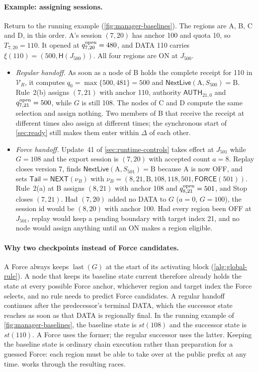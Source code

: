 \documentclass[11pt,a4paper]{article}
\newcommand{\Hash}{\mathsf H}
\newcommand{\tagg}[1]{\ensuremath{\mathsf{#1}}}
\begin{document}
\paragraph{Example: assigning sessions.}
Return to the running example (\cref{fig:manager-baselines}). The
regions are A, B, C and D, in this order. A's session $(7,20)$ has
anchor 100 and quota 10, so $T_{7,20}=110$. It opened at
$q^{\rm open}_{7,20}=480$, and DATA 110 carries
$\xi(110)=(500,\Hash(J_{500}))$. All four regions are ON at $J_{500}$.
\begin{itemize}
\item \emph{Regular handoff.} As soon as a node of B holds the complete
receipt for 110 in $\mathcal V_R$, it computes
$q_0=\max\{500,481\}=500$ and
$\tagg{NextLive}(\text{A},S_{500})=\text{B}$. Rule~2(b) assigns
$(7,21)$ with anchor 110, authority $\tagg{AUTH}_{21,0}$ and
$q^{\rm open}_{7,21}=500$, while $G$ is still 108. The nodes of C and D
compute the same selection and assign nothing. Two members of B that
receive the receipt at different times also assign at different times;
the synchronous start of \cref{sec:ready} still makes them enter within
$\Delta$ of each other.
\item \emph{Force handoff.} Update~41 of \cref{sec:runtime-controls}
takes effect at $J_{501}$ while $G=108$ and the export session is
$(7,20)$ with accepted count $a=8$. Replay closes version 7, finds
$\tagg{NextLive}(\text{A},S_{501})=\text{B}$ because A is now OFF, and
sets $\mathsf{Tail}=\tagg{NEXT}(\nu_B)$ with
$\nu_B=(8,21,\text{B},108,118,501,\tagg{FORCE}(501))$. Rule~2(a) at B assigns
$(8,21)$ with anchor 108 and $q^{\rm open}_{8,21}=501$, and Stop closes
$(7,21)$. Had $(7,20)$ added no DATA to $G$ ($a=0$, $G=100$), the
session id would be $(8,20)$ with anchor 100. Had every region been OFF
at $J_{501}$, replay would keep a pending boundary with target index 21,
and no node would assign anything until an ON makes a region eligible.
\end{itemize}

\paragraph{Why two checkpoints instead of Force candidates.}
A Force always keeps $\operatorname{last}(G)$ at the start of its
activating block (\cref{alg:global-rule}). A node that keeps its baseline state current
therefore already holds the state at every possible Force anchor,
whichever region and target index the Force selects, and no rule needs
to predict Force candidates. A regular handoff continues after the
predecessor's terminal DATA, which the successor state reaches as soon as that DATA is
regionally final.  In the running example of
\cref{fig:manager-baselines}, the baseline state is $\mathit{st}(108)$
and the successor state is $\mathit{st}(110)$.  A Force uses the former;
the regular successor uses the latter.  Keeping the baseline state is ordinary chain execution rather than
preparation for a guessed Force: each region must be able to take over
at the public prefix at any time.   works through
the resulting races.
\end{document}

